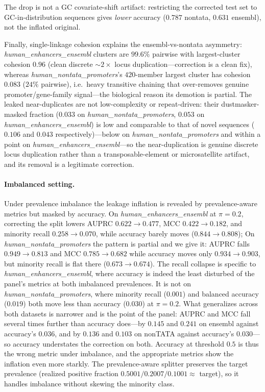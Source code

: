 \documentclass[webpdf,modern,large,namedate]{oup-authoring-template}%
\begin{document}
The drop is not a GC covariate-shift artifact: restricting the corrected test set to GC-in-distribution sequences gives \emph{lower} accuracy ($0.787$ nontata, $0.631$ ensembl), not the inflated original. 

Finally, single-linkage cohesion explains the ensembl-vs-nontata asymmetry: \textit{human\_enhancers\_ensembl} clusters are $99.6\%$ pairwise with largest-cluster cohesion $0.96$ (clean discrete $\sim2\times$ locus duplication---correction is a clean fix), whereas \textit{human\_nontata\_promoters}'s $420$-member largest cluster has cohesion $0.083$ ($24\%$ pairwise), i.e.\ heavy transitive chaining that over-removes genuine promoter/gene-family signal---the biological reason its demotion is partial. The leaked near-duplicates are not low-complexity or repeat-driven: their dustmasker-masked fraction ($0.033$ on \textit{human\_nontata\_promoters}, $0.053$ on \textit{human\_enhancers\_ensembl}) is low and comparable to that of novel sequences ($0.106$ and $0.043$ respectively)---below on \textit{human\_nontata\_promoters} and within a point on \textit{human\_enhancers\_ensembl}---so the near-duplication is genuine discrete locus duplication rather than a transposable-element or microsatellite artifact, and its removal is a legitimate correction.

\paragraph{Imbalanced setting.}
Under prevalence imbalance the leakage inflation is revealed by prevalence-aware metrics but masked by accuracy. On \textit{human\_enhancers\_ensembl} at $\pi=0.2$, correcting the split lowers AUPRC $0.622\to0.477$, MCC $0.422\to0.182$, and minority recall $0.258\to0.070$, while accuracy barely moves ($0.844\to0.808$); On \textit{human\_nontata\_promoters} the pattern is partial and we give it: AUPRC falls $0.949\to0.813$ and MCC $0.785\to0.682$ while accuracy moves only $0.934\to0.903$, but minority recall is flat there ($0.673\to0.674$). The recall collapse is specific to \textit{human\_enhancers\_ensembl}, where accuracy is indeed the least disturbed of the panel's metrics at both imbalanced prevalences. It is not on \textit{human\_nontata\_promoters}, where minority recall ($0.001$) and balanced accuracy ($0.019$) both move less than accuracy ($0.030$) at $\pi=0.2$. What generalizes across both datasets is narrower and is the point of the panel: AUPRC and MCC fall several times further than accuracy does---by $0.145$ and $0.241$ on ensembl against accuracy's $0.036$, and by $0.136$ and $0.103$ on nonTATA against accuracy's $0.030$---so accuracy understates the correction on both. Accuracy at threshold $0.5$ is thus the wrong metric under imbalance, and the appropriate metrics show the inflation even more starkly. The prevalence-aware splitter preserves the target prevalence (realized positive fraction $0.5001/0.2007/0.1001\approx$ target), so it handles imbalance without skewing the minority class.
\end{document}
